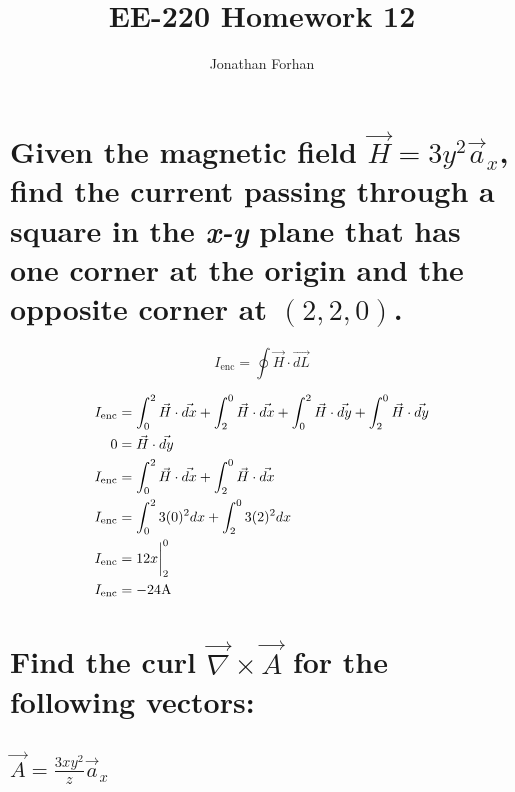 \documentclass[14pt]{extarticle}
\title{EE-220 Homework 12}
\author{Jonathan Forhan}
\date{ }
\begin{document}
\maketitle

\boldmath
\section{Given the magnetic field $\vec{H}=3y^2\vec{a}_x$, find the
  current passing through a square in the \textit{x-y} plane
  that has one corner at the origin and the opposite
  corner at $(2,2,0)$.}
\unboldmath

\begin{center}
\end{center}

$$I_{\mathrm{enc}}=\oint\vec{H}\cdot\vec{dL}$$

\begin{align*}
	I_{\mathrm{enc}} & =
	\int^{2}_{0}\vec{H}\cdot\vec{dx}+
	\int^{0}_{2}\vec{H}\cdot\vec{dx}+
	\int^{2}_{0}\vec{H}\cdot\vec{dy}+
	\int^{0}_{2}\vec{H}\cdot\vec{dy}                                   \\
	0                & = \vec{H}\cdot\vec{dy}                          \\
	I_{\mathrm{enc}} & =
	\int^{2}_{0}\vec{H}\cdot\vec{dx}+ \int^{0}_{2}\vec{H}\cdot\vec{dx} \\
	I_{\mathrm{enc}} & =
	\int^{2}_{0}3(0)^2dx+ \int^{0}_{2}3(2)^2dx                         \\
	I_{\mathrm{enc}} & = 12x\bigg{|}^0_2                               \\
	I_{\mathrm{enc}} & = -24\mathrm{A}
\end{align*}

\boldmath
\section{Find the curl $\vec{\nabla}\times\vec{A}$ for the following vectors:}
\unboldmath

\boldmath
\subsection{$\vec{A}=\frac{3xy^2}{z}\vec{a}_x$}
\unboldmath
\end{document}
